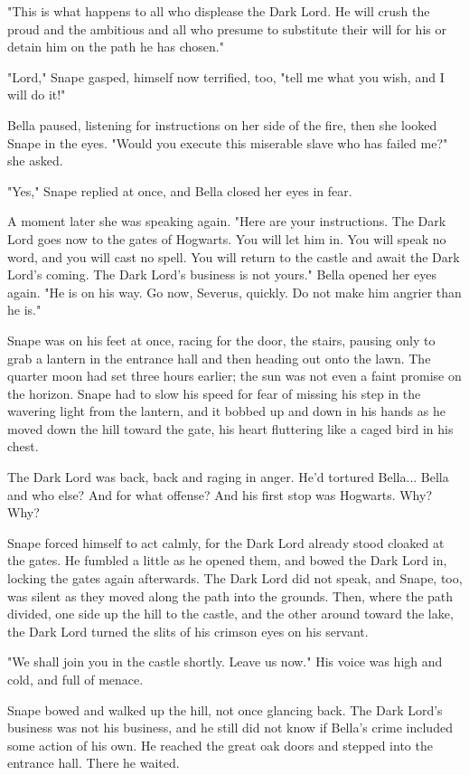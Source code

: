 \documentclass[a4paper,11pt]{article}
\begin{document}
"This is what happens to all who displease the Dark Lord. He will crush the proud and the ambitious and all who presume to substitute their will for his or detain him on the path he has chosen."

"Lord," Snape gasped, himself now terrified, too, "tell me what you wish, and I will do it!"

Bella paused, listening for instructions on her side of the fire, then she looked Snape in the eyes. "Would you execute this miserable slave who has failed me?" she asked.

"Yes," Snape replied at once, and Bella closed her eyes in fear.

A moment later she was speaking again. "Here are your instructions. The Dark Lord goes now to the gates of Hogwarts. You will let him in. You will speak no word, and you will cast no spell. You will return to the castle and await the Dark Lord's coming. The Dark Lord's business is not yours." Bella opened her eyes again. "He is on his way. Go now, Severus, quickly. Do not make him angrier than he is."

Snape was on his feet at once, racing for the door, the stairs, pausing only to grab a lantern in the entrance hall and then heading out onto the lawn. The quarter moon had set three hours earlier; the sun was not even a faint promise on the horizon. Snape had to slow his speed for fear of missing his step in the wavering light from the lantern, and it bobbed up and down in his hands as he moved down the hill toward the gate, his heart fluttering like a caged bird in his chest.

The Dark Lord was back, back and raging in anger. He'd tortured Bella... Bella and who else? And for what offense? And his first stop was Hogwarts. Why? Why?

Snape forced himself to act calmly, for the Dark Lord already stood cloaked at the gates. He fumbled a little as he opened them, and bowed the Dark Lord in, locking the gates again afterwards. The Dark Lord did not speak, and Snape, too, was silent as they moved along the path into the grounds. Then, where the path divided, one side up the hill to the castle, and the other around toward the lake, the Dark Lord turned the slits of his crimson eyes on his servant.

"We shall join you in the castle shortly. Leave us now." His voice was high and cold, and full of menace.

Snape bowed and walked up the hill, not once glancing back. The Dark Lord's business was not his business, and he still did not know if Bella's crime included some action of his own. He reached the great oak doors and stepped into the entrance hall. There he waited.
\end{document}
